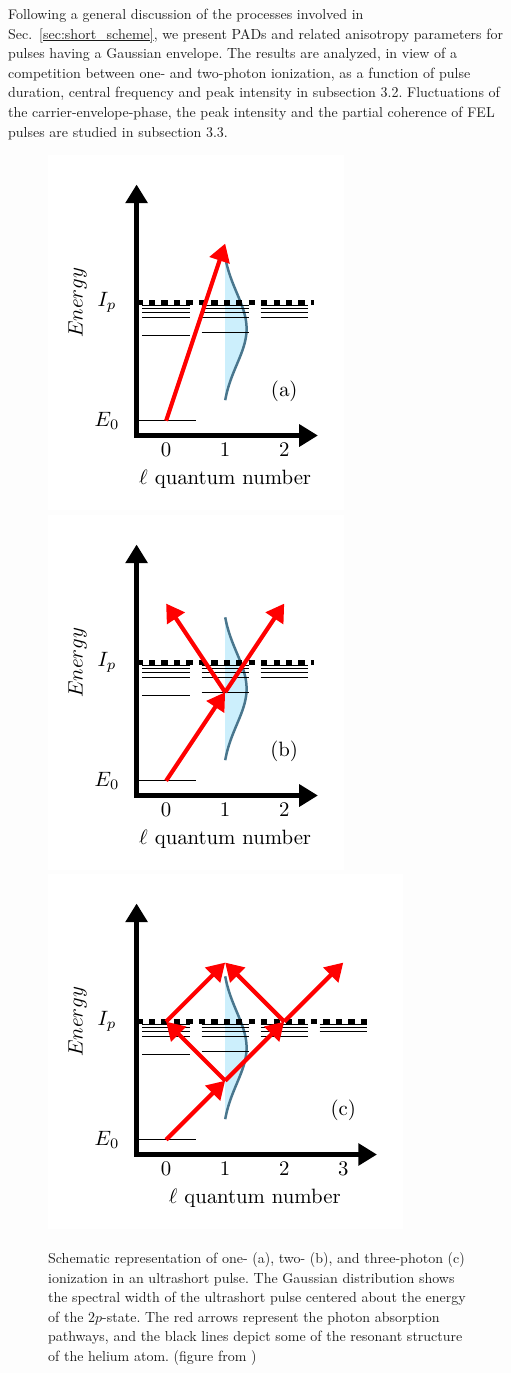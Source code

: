 Following a general discussion of the processes involved in Sec.~\ref{sec:short_scheme}, we present PADs and related anisotropy parameters for pulses having a Gaussian envelope. The results are analyzed, in view of a competition between one- and two-photon ionization, as a function of pulse duration, central frequency and peak intensity in subsection 3.2. Fluctuations of the carrier-envelope-phase, the peak intensity and the partial coherence of FEL pulses are studied in subsection 3.3.

\begin{figure}[!ht]
\centering
\includegraphics[width=.3\linewidth]{figs/Photo_ionization/short_pulse/scheme_1-photon.pdf}
\includegraphics[width=.3\linewidth]{figs/Photo_ionization/short_pulse/scheme_2-photon.pdf}
\includegraphics[width=.36\linewidth]{figs/Photo_ionization/short_pulse/scheme_3-photon.pdf}
\caption{
Schematic representation of one- (a), two- (b), and three-photon (c) ionization in an ultrashort pulse. The Gaussian distribution shows the spectral width of the ultrashort pulse centered about the energy of the $2p$-state. The red arrows represent the photon absorption pathways, and the black lines depict some of the resonant structure of the helium atom. (figure from \cite{venzke2020_ionization})
} 
  \label{fig:scheme_short}
\end{figure}

